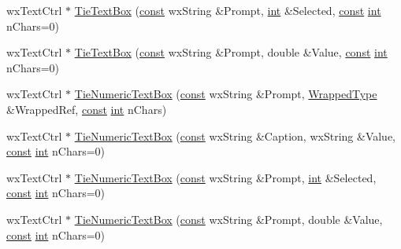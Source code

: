 \begin{DoxyCompactItemize}
\item 
wx\+Text\+Ctrl $\ast$ \hyperlink{class_shuttle_gui_base_abf2f868a91ec6da20614c601378aeb89}{Tie\+Text\+Box} (\hyperlink{getopt1_8c_a2c212835823e3c54a8ab6d95c652660e}{const} wx\+String \&Prompt, \hyperlink{xmltok_8h_a5a0d4a5641ce434f1d23533f2b2e6653}{int} \&Selected, \hyperlink{getopt1_8c_a2c212835823e3c54a8ab6d95c652660e}{const} \hyperlink{xmltok_8h_a5a0d4a5641ce434f1d23533f2b2e6653}{int} n\+Chars=0)
\item 
wx\+Text\+Ctrl $\ast$ \hyperlink{class_shuttle_gui_base_ac472f025e91b6223ab7b7f9cf6bcf94e}{Tie\+Text\+Box} (\hyperlink{getopt1_8c_a2c212835823e3c54a8ab6d95c652660e}{const} wx\+String \&Prompt, double \&Value, \hyperlink{getopt1_8c_a2c212835823e3c54a8ab6d95c652660e}{const} \hyperlink{xmltok_8h_a5a0d4a5641ce434f1d23533f2b2e6653}{int} n\+Chars=0)
\item 
wx\+Text\+Ctrl $\ast$ \hyperlink{class_shuttle_gui_base_acc722cbd4c91fe5de5b89717afda09d4}{Tie\+Numeric\+Text\+Box} (\hyperlink{getopt1_8c_a2c212835823e3c54a8ab6d95c652660e}{const} wx\+String \&Prompt, \hyperlink{class_wrapped_type}{Wrapped\+Type} \&Wrapped\+Ref, \hyperlink{getopt1_8c_a2c212835823e3c54a8ab6d95c652660e}{const} \hyperlink{xmltok_8h_a5a0d4a5641ce434f1d23533f2b2e6653}{int} n\+Chars)
\item 
wx\+Text\+Ctrl $\ast$ \hyperlink{class_shuttle_gui_base_aba2434686f5a1c0fdbc48428ba76365c}{Tie\+Numeric\+Text\+Box} (\hyperlink{getopt1_8c_a2c212835823e3c54a8ab6d95c652660e}{const} wx\+String \&Caption, wx\+String \&Value, \hyperlink{getopt1_8c_a2c212835823e3c54a8ab6d95c652660e}{const} \hyperlink{xmltok_8h_a5a0d4a5641ce434f1d23533f2b2e6653}{int} n\+Chars=0)
\item 
wx\+Text\+Ctrl $\ast$ \hyperlink{class_shuttle_gui_base_a2ad650f07864edbb604a5f288d350d3a}{Tie\+Numeric\+Text\+Box} (\hyperlink{getopt1_8c_a2c212835823e3c54a8ab6d95c652660e}{const} wx\+String \&Prompt, \hyperlink{xmltok_8h_a5a0d4a5641ce434f1d23533f2b2e6653}{int} \&Selected, \hyperlink{getopt1_8c_a2c212835823e3c54a8ab6d95c652660e}{const} \hyperlink{xmltok_8h_a5a0d4a5641ce434f1d23533f2b2e6653}{int} n\+Chars=0)
\item 
wx\+Text\+Ctrl $\ast$ \hyperlink{class_shuttle_gui_base_a209b7c9df022fc4f9e977bc05d3ce6ee}{Tie\+Numeric\+Text\+Box} (\hyperlink{getopt1_8c_a2c212835823e3c54a8ab6d95c652660e}{const} wx\+String \&Prompt, double \&Value, \hyperlink{getopt1_8c_a2c212835823e3c54a8ab6d95c652660e}{const} \hyperlink{xmltok_8h_a5a0d4a5641ce434f1d23533f2b2e6653}{int} n\+Chars=0)
\item 

\end{DoxyCompactItemize}
